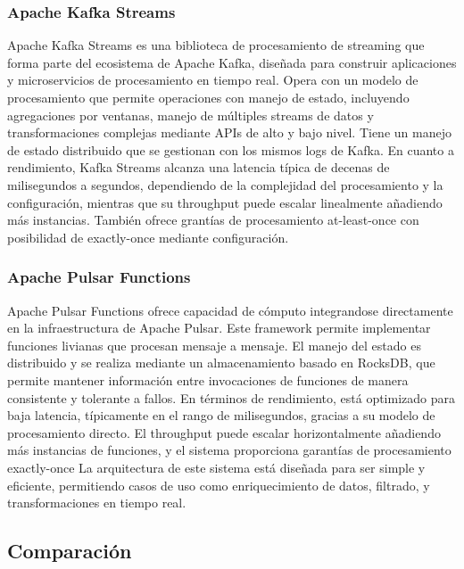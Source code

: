 \newpage
\subsubsection{Apache Kafka Streams}

Apache Kafka Streams es una biblioteca de procesamiento de streaming que forma parte del ecosistema de Apache Kafka, diseñada para construir aplicaciones y microservicios de procesamiento en tiempo real.
Opera con un modelo de procesamiento que permite operaciones con manejo de estado, incluyendo agregaciones por ventanas, manejo de múltiples streams de datos 
y transformaciones complejas mediante APIs de alto y bajo nivel. Tiene un manejo de estado distribuido que se gestionan con los mismos logs de Kafka.
En cuanto a rendimiento, Kafka Streams alcanza una latencia típica de decenas de milisegundos a segundos, dependiendo de la complejidad del procesamiento y la configuración, 
mientras que su throughput puede escalar linealmente añadiendo más instancias. También ofrece grantías de procesamiento at-least-once con posibilidad de exactly-once mediante configuración.


\subsubsection{Apache Pulsar Functions}

Apache Pulsar Functions ofrece capacidad de cómputo integrandose directamente en la infraestructura de Apache Pulsar. 
Este framework permite implementar funciones livianas que procesan mensaje a mensaje. 
El manejo del estado es distribuido y se realiza mediante un almacenamiento basado en RocksDB, que permite mantener información 
entre invocaciones de funciones de manera consistente y tolerante a fallos. En términos de rendimiento, está optimizado para baja latencia, típicamente en el rango de milisegundos, 
gracias a su modelo de procesamiento directo. 
El throughput puede escalar horizontalmente añadiendo más instancias de funciones, y el sistema proporciona garantías de procesamiento exactly-once 
La arquitectura de este sistema está diseñada para ser simple y eficiente, permitiendo casos de uso como enriquecimiento de datos, filtrado, y transformaciones 
en tiempo real.


\newpage
\subsection{Comparación}

